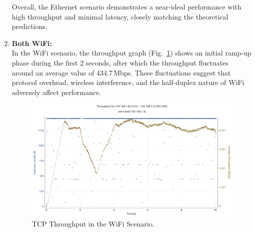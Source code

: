 \begin{enumerate}
                

                Overall, the Ethernet scenario demonstrates a near-ideal performance with high throughput and minimal latency, closely matching the theoretical predictions.

            \item \textbf{Both WiFi:} \\
                In the WiFi scenario, the throughput graph (Fig.~\ref{fig:throughput-wifi-tcp}) shows an initial ramp-up phase during the first 2 seconds, after which the throughput fluctuates around an average value of 434.7\,Mbps. 
                These fluctuations suggest that protocol overhead, wireless interference, and the half-duplex nature of WiFi adversely affect performance. \\
                
                \begin{figure}[ht]
                    \centering
                    \includegraphics[width=0.9\columnwidth]{images/graphs/Throughput/Throughput_WiFi_TCP.pdf}
                    \caption{TCP Throughput in the WiFi Scenario.}
                    \label{fig:throughput-wifi-tcp}
                \end{figure}


\end{enumerate}

